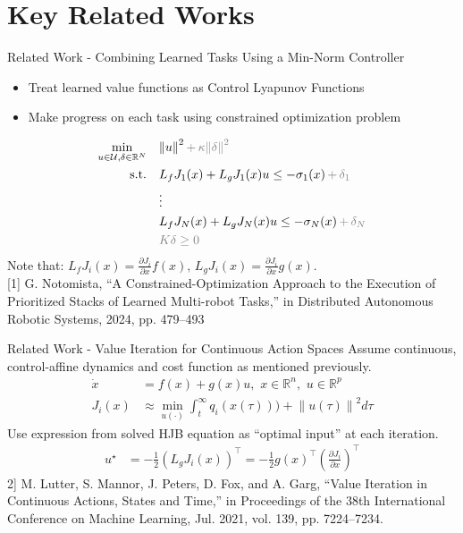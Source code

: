 \section{Key Related Works}

\begin{frame}{Related Work - Combining Learned Tasks Using a Min-Norm Controller}
	\begin{itemize}
		\item{Treat learned value functions as Control Lyapunov Functions}
		\item{Make progress on each task using constrained optimization problem}
	\end{itemize}
	\begin{align*}
		\min_{u \in \mathcal{U}, \delta \in \mathbb{R}^N} \quad & { \lVert u \rVert }^2 \, { \color{gray} + \, \kappa { \lVert \delta \rVert }^2 } \\
		\textrm{s.t.} \quad & L_f {J}_1 (x) + L_g {J}_1 (x) u \le - \sigma_1(x) \, {\color{gray} + \, \delta_1 } \\
                \quad & \vdots \\
		\quad & L_f {J}_N (x) + L_g {J}_N (x) u \le - \sigma_N(x) \, {\color{gray} + \, \delta_N } \\
		\quad & { \color{gray} K \delta \ge 0 }
	\end{align*}
        Note that: $L_f {J}_i(x) = \frac{\partial {J}_i}{\partial x} f(x), \, L_g {J}_i(x) = \frac{\partial {J}_i}{\partial x} g(x)$.\\
	\seprule
	\footnotesize{[1] G. Notomista, “A Constrained-Optimization Approach to the Execution of Prioritized Stacks of Learned Multi-robot Tasks,” in Distributed Autonomous Robotic Systems, 2024, pp. 479–493}
\end{frame}

\begin{frame}{Related Work - Value Iteration for Continuous Action Spaces}
	Assume continuous, control-affine dynamics and cost function as mentioned previously.
	\begin{align*}
		\dot{x} &= f(x) + g(x)u, \,\, x \in \mathbb{R}^n, \,\, u \in \mathbb{R}^p \\
		J_i (x) &\approx \min_{u(\cdot)} \int_t^{\infty} q_i(x(\tau))) + {\lVert u(\tau) \rVert}^2 d \tau
	\end{align*}
	Use expression from solved HJB equation as ``optimal input'' at each iteration.
	\begin{align*}
		u^{\star} &= - \frac{1}{2} ( L_g {J}_i (x) )^{\top} = - \frac{1}{2} g(x)^{\top} \left( \frac{\partial {J}_i}{\partial x} \right)^{\top}
	\end{align*}
	\seprule
	\footnotesize{2] M. Lutter, S. Mannor, J. Peters, D. Fox, and A. Garg, “Value Iteration in Continuous Actions, States and Time,” in Proceedings of the 38th International Conference on Machine Learning, Jul. 2021, vol. 139, pp. 7224–7234.}
\end{frame}

